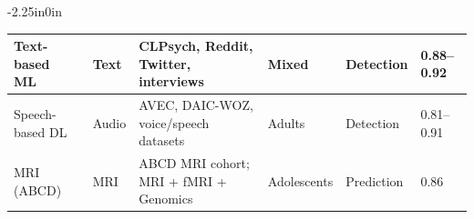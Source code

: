 \documentclass[10pt,letterpaper]{article}
\begin{document}
\begin{table}[!t]
\begin{adjustwidth}{-2.25in}{0in}
\begin{tabular}{|p{3.0cm}|p{2.4cm}|p{3.6cm}|p{2.0cm}|p{2.0cm}|p{2.4cm}|}
                                                                                                                          Text-based ML~\cite{ref11,ref17}
                                                                                                                          & Text
                                                                                                                          & CLPsych, Reddit, Twitter, interviews
                                                                                                                          & Mixed
                                                                                                                          & Detection
                                                                                                                          & 0.88--0.92 \\
                                                                                                                          \hline

                                                                                                                          Speech-based DL~\cite{ref14,ref27}
                                                                                                                          & Audio
                                                                                                                          & AVEC, DAIC-WOZ, voice/speech datasets
                                                                                                                          & Adults
                                                                                                                          & Detection
                                                                                                                          & 0.81--0.91 \\
                                                                                                                          \hline

                                                                                                                          MRI (ABCD)~\cite{ref46}
                                                                                                                          & MRI
                                                                                                                          & ABCD MRI cohort; MRI + fMRI + Genomics
                                                                                                                          & Adolescents
                                                                                                                          & Prediction
                                                                                                                          & 0.86 \\
                                                                                                                          \hline


\end{tabular}
\end{adjustwidth}
\end{table}
\end{document}
